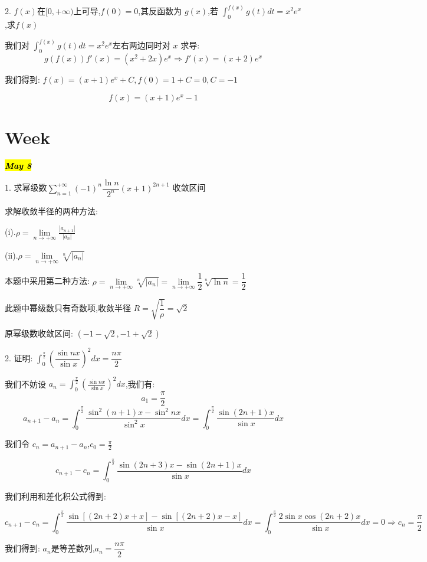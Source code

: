 
2. $f(x)$在$[0,+\infty)$上可导,$f(0)=0$,其反函数为 $g(x)$,若 $\int_{0}^{f(x)}g(t)dt=x^2e^x$,求$f(x)$
\begin{solution}
	
	我们对 $\int_{0}^{f(x)}g(t)dt=x^2e^x$左右两边同时对 $x$ 求导: 
	$$g(f(x))f'(x)=(x^2+2x)e^x\Rightarrow f'(x)=(x+2)e^{x}$$
	
	我们得到: $f(x)=(x+1)e^x+C,f(0)=1+C=0,C=-1$
	
	$$f(x)=(x+1)e^{x}-1$$
\end{solution}


\section{Week }
\hl{\textbf{\textit{May 8}}}

1. 求幂级数$\sum\limits_{n=1}^{+\infty}(-1)^{n}\dfrac{\ln n}{2^{n}}(x+1)^{2n+1}$ 收敛区间
\begin{solution}
	
	求解收敛半径的两种方法: 
	
	(i).$\rho=\lim\limits_{n\rightarrow +\infty}\frac{|a_{n+1}|}{|a_{n}|}$
	
	(ii).$\rho=\lim\limits_{n\rightarrow +\infty}\sqrt[n]{|a_{n}|}$
	
	本题中采用第二种方法: $\rho=\lim\limits_{n\rightarrow +\infty}\sqrt[n]{|a_{n}|}=\lim\limits_{n\rightarrow +\infty}\dfrac{1}{2}\sqrt[n]{\ln n}=\dfrac{1}{2}$
	
	此题中幂级数只有奇数项,收敛半径 $R=\sqrt{\dfrac{1}{\rho}}=\sqrt{2}$
	
	原幂级数收敛区间: $(-1-\sqrt{2},-1+\sqrt{2})$
\end{solution}


2. 证明: $\int_{0}^{\frac{\pi}{2}}\left( \dfrac{\sin nx}{\sin x}\right) ^2dx=\dfrac{n\pi}{2}$
\begin{solution}
	
	我们不妨设 $a_{n}=\int_{0}^{\frac{\pi}{2}}(\frac{\sin nx}{\sin x})^2dx$,我们有: 
	$$a_{1}=\frac{\pi}{2}$$ $$a_{n+1}-a_{n}=\int_{0}^{\frac{\pi}{2}}\frac{\sin ^2(n+1)x-\sin^2 nx}{\sin^2 x}dx=\int_{0}^{\frac{\pi}{2}}\frac{\sin (2n+1)x}{\sin x}dx$$
	
	我们令 $c_{n}=a_{n+1}-a_{n}$,$c_{0}=\frac{\pi}{2}$
	
	$$c_{n+1}-c_{n}=\int_{0}^{\frac{\pi}{2}}\frac{\sin (2n+3)x-\sin (2n+1)x}{\sin x}dx$$
	
	我们利用和差化积公式得到: 
	
	$$c_{n+1}-c_{n}=\int_{0}^{\frac{\pi}{2}}\frac{\sin [(2n+2)x+x]-\sin [(2n+2)x-x]}{\sin x}dx=\int_{0}^{\frac{\pi}{2}}\frac{2\sin x\cos(2n+2)x}{\sin x}dx=0\Rightarrow c_{n}=\frac{\pi}{2}$$
	
	我们得到: $a_{n}$是等差数列,$a_{n}=\dfrac{n\pi}{2}$
\end{solution}

